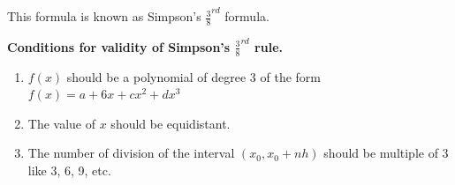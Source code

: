 \documentclass{article}
\begin{document}
              This formula is known as Simpson's $\frac{3}{8}^{rd}$ formula.
              
              \textbf{Conditions for validity of Simpson's $\frac{3}{8}^{rd}$ rule.}

              \begin{enumerate}
                \item $f(x)$ should be a polynomial of degree 3 of the form 
                  $f(x)=a+6x+cx^2+dx^3$
                \item The value of $x$ should be equidistant.
                \item The number of division of the interval $(x_0,x_0+nh)$
                  should be multiple of 3 like 3, 6, 9, etc.
              \end{enumerate}



\end{document}
